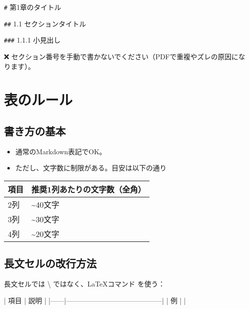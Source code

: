 \documentclass[
  12pt,
  a4paper,
  oneside,
]{article}
\providecommand{\tightlist}{%
  \setlength{\itemsep}{0pt}\setlength{\parskip}{0pt}
}
\begin{document}
\begin{CodeBlockBox}
\verb|#| 第1章のタイトル

\verb|##| 1.1 セクションタイトル

\verb|###| 1.1.1 小見出し
\end{CodeBlockBox}

❌ セクション番号を手動で書かないでください（PDFで重複やズレの原因になります）。

\section{表のルール}\label{ux8868ux306eux30ebux30fcux30eb}

\subsection{書き方の基本}\label{ux66f8ux304dux65b9ux306eux57faux672c}

\begin{itemize}
\tightlist
\item
  通常のMarkdown表記でOK。
\item
  ただし、文字数に制限がある。目安は以下の通り
\end{itemize}

\begin{longtable}[]{@{}ll@{}}
\toprule\noalign{}
項目 & 推奨1列あたりの文字数（全角） \\
\midrule\noalign{}
\endhead
\bottomrule\noalign{}
\endlastfoot
2列 & \textasciitilde40文字 \\
3列 & \textasciitilde30文字 \\
4列 & \textasciitilde20文字 \\
\end{longtable}

\subsection{長文セルの改行方法}\label{ux9577ux6587ux30bbux30ebux306eux6539ux884cux65b9ux6cd5}

長文セルでは \textbackslash{} ではなく、LaTeXコマンド  を使う：

\begin{CodeBlockBox}
| 項目 | 説明                                     |
|------|------------------------------------------|
| 例   |  |
\end{CodeBlockBox}
\end{document}

